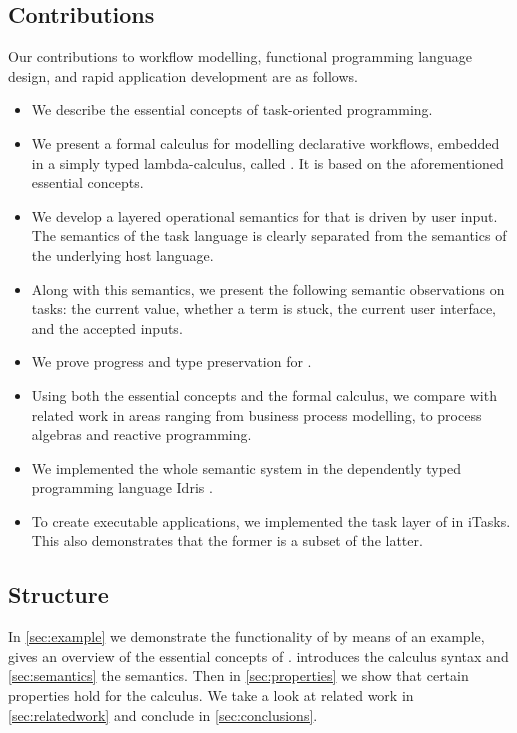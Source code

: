 \subsection{Contributions}

Our contributions to workflow modelling, functional programming language design, and rapid application development are as follows.


\begin{itemize}
  \item
    We describe the essential concepts of task-oriented programming.

  \item
    We present a formal calculus for modelling declarative workflows, embedded in a simply typed lambda-calculus, called \TOPHAT.
    It is based on the aforementioned essential \TOP concepts.

  \item
    We develop a layered operational semantics for \TOPHAT that is driven by user input.
    The semantics of the task language is clearly separated from the semantics of the underlying host language.

  \item
    Along with this semantics, we present the following semantic observations on tasks:
    the current value, whether a term is stuck, the current user interface, and the accepted inputs.

  \item
    We prove progress and type preservation for \TOPHAT.

  \item
    Using both the essential concepts and the formal calculus, we compare \TOP with related work in areas ranging from business process modelling, to process algebras and reactive programming.

  \item
    We implemented the whole semantic system in the dependently typed programming language Idris \cite{journals/jfp/Brady13}.

  \item
    To create executable applications, we implemented the task layer of \TOPHAT in iTasks.
    This also demonstrates that the former is a subset of the latter.


\end{itemize}


\subsection{Structure}

In \cref{sec:example} we demonstrate the functionality of \TOPHAT by means of an example,
 gives an overview of the essential concepts of \TOP.
 introduces the \TOPHAT calculus syntax
and \cref{sec:semantics} the semantics.
Then in \cref{sec:properties} we show that certain properties hold for the calculus.
We take a look at related work in \cref{sec:relatedwork}
and conclude in \cref{sec:conclusions}.
